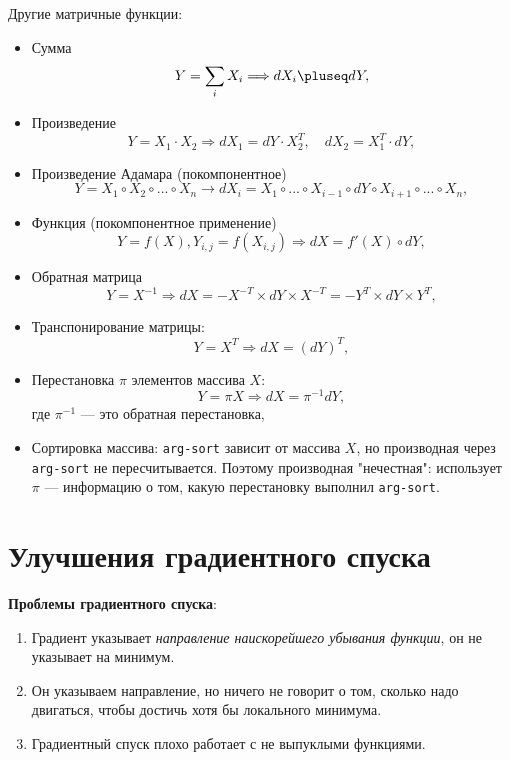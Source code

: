 \begin{example}
    Другие матричные функции:
    \begin{itemize}
        \item Сумма
        \[
            Y=\sum_i X_i\Longrightarrow dX_i\pluseq dY,
        \]
        \item Произведение
        \[
            Y=X_1\cdot X_2\Longrightarrow dX_1=dY\cdot X_2^T,\quad dX_2=X_1^T\cdot dY,
        \]
        \item Произведение Адамара (покомпонентное)
        \[
            Y=X_1\circ X_2\circ...\circ X_n \longrightarrow dX_i=X_1\circ...\circ X_{i-1}\circ dY\circ X_{i+1}\circ...\circ X_n,
        \]
        \item Функция (покомпонентное применение)
        \[
            Y=f(X),Y_{i,j}=f(X_{i,j})\Longrightarrow dX=f'(X)\circ dY,
        \]
        \item Обратная матрица
        \[
            Y=X^{-1}\Longrightarrow dX=-X^{-T}\times dY\times X^{-T}=-Y^T\times dY\times Y^T,
        \]
        \item Транспонирование матрицы:
        \[
            Y=X^T\Longrightarrow dX=(dY)^T,
        \]
        \item Перестановка $\pi$ элементов массива $X$:
        \[
            Y=\pi X\Longrightarrow dX=\pi^{-1}dY,
        \]
        где $\pi^{-1}$ --- это обратная перестановка,
        \item Сортировка массива: \texttt{arg-sort} зависит от массива $X$, но производная через \texttt{arg-sort} не пересчитывается. Поэтому производная "нечестная": использует $\pi$ --- информацию о том, какую перестановку выполнил \texttt{arg-sort}.
    \end{itemize}
\end{example}

\section{Улучшения градиентного спуска}

\textbf{Проблемы градиентного спуска}:
\begin{enumerate}
    \item Градиент указывает \textit{направление наискорейшего убывания функции}, он не указывает на минимум.
    \item Он указываем направление, но ничего не говорит о том, сколько надо двигаться, чтобы достичь хотя бы локального минимума.
    \item Градиентный спуск плохо работает с не выпуклыми функциями.
\end{enumerate}

